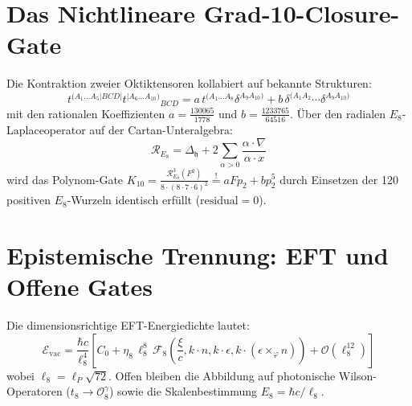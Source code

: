 \documentclass[11pt,a4paper]{article}
\begin{document}
\section{Das Nichtlineare Grad-10-Closure-Gate}
Die Kontraktion zweier Oktiktensoren kollabiert auf bekannte Strukturen:
$$t^{(A_1 \dots A_5 | BCD |} t^{|A_6 \dots A_{10})} {}_{BCD} = a \, t^{(A_1 \dots A_8} \delta^{A_9 A_{10})} + b \, \delta^{(A_1 A_2} \cdots \delta^{A_9 A_{10})}$$
mit den rationalen Koeffizienten $a = \frac{130065}{1778}$ und $b = \frac{1233765}{64516}$. Über den radialen $E_8$-Laplaceoperator auf der Cartan-Unteralgebra:
$$\mathcal{R}_{E_8} = \Delta_{\mathfrak{h}} + 2\sum_{\alpha>0} \frac{\alpha \cdot \nabla}{\alpha \cdot x}$$
wird das Polynom-Gate $K_{10} = \frac{\mathcal{R}_{E_8}^3 (F^2)}{8 \cdot (8 \cdot 7 \cdot 6)^2} \stackrel{!}{=} a F p_2 + b p_2^5$ durch Einsetzen der 120 positiven $E_8$-Wurzeln identisch erfüllt ($\text{residual} = 0$).

\section{Epistemische Trennung: EFT und Offene Gates}
Die dimensionsrichtige EFT-Energiedichte lautet:
$$\mathcal{E}_{\text{vac}} = \frac{\hbar c}{\ell_8^4} \left[ C_0 + \eta_8 \, \ell_8^8 \, \mathscr{F}_8\left(\frac{\xi}{c}, k\cdot n, k\cdot\epsilon, k\cdot(\epsilon\times_\varphi n)\right) + \mathcal{O}(\ell_8^{12}) \right]$$
wobei $\ell_8 = \ell_P \sqrt{72}$. Offen bleiben die Abbildung auf photonische Wilson-Operatoren ($t_8 \to \mathcal{O}_8^\gamma$) sowie die Skalenbestimmung $E_8 = \hbar c / \ell_8$.
\end{document}
